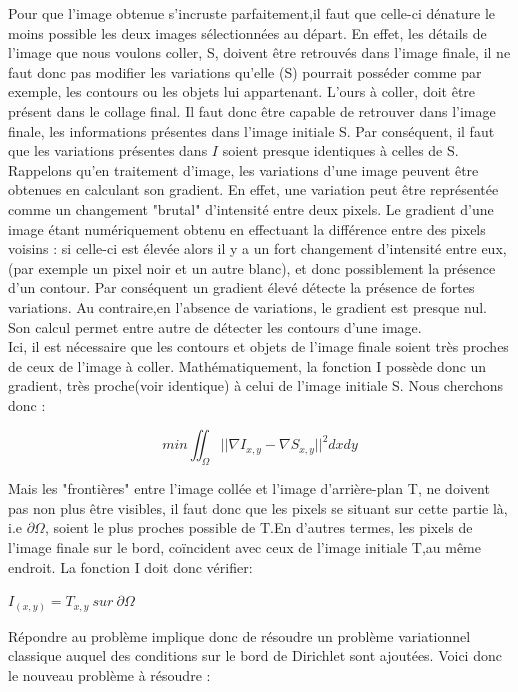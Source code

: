 Pour que l'image obtenue s'incruste parfaitement,il faut que celle-ci dénature le moins possible les deux images sélectionnées au départ. En effet, les détails de l'image que nous voulons coller, S, doivent être retrouvés dans l'image finale, il ne faut donc pas modifier les variations qu'elle (S) pourrait posséder comme par exemple, les contours ou les objets lui appartenant. L'ours  à coller, doit être présent dans le collage final. Il faut donc être capable de retrouver dans l'image finale, les informations présentes dans l'image initiale S. Par conséquent, il faut que les variations présentes dans $I$ soient presque identiques à celles de S.\\
Rappelons qu'en traitement d'image, les variations d'une image peuvent être obtenues en calculant son gradient. En effet, une variation peut être représentée comme un changement "brutal" d'intensité entre deux pixels. Le gradient d'une image étant numériquement obtenu en effectuant la différence entre des pixels voisins : si celle-ci est élevée alors il y a un fort changement d'intensité entre eux, (par exemple un pixel noir et un autre blanc), et donc possiblement la présence d'un contour. Par conséquent un gradient élevé détecte la présence de fortes variations. Au contraire,en l'absence de variations, le gradient est presque nul. Son calcul permet entre autre de détecter les contours d'une image.\\
Ici, il est nécessaire que les contours et objets de l'image finale soient très proches de ceux de l'image à coller. Mathématiquement, la fonction I possède donc un gradient, très proche(voir identique) à celui de l'image initiale S. Nous cherchons donc :
\begin{center}
    $$ min \iint_\Omega || \nabla I_{x,y} - \nabla S_{x,y}||^2 dxdy$$
\end{center} 

Mais les "frontières" entre l'image collée et l'image d'arrière-plan T, ne doivent pas non plus être visibles, il faut donc que les pixels se situant sur cette partie là, i.e $\partial \Omega$, soient le plus proches possible de T.En d'autres termes, les pixels de l'image finale sur le bord, coïncident avec ceux de l'image initiale T,au même endroit. La fonction I doit donc vérifier: 
\begin{center}
    $I_{(x,y)} = T_{x,y} \ sur\ \partial \Omega$
\end{center}

Répondre au problème implique donc de résoudre un problème variationnel classique auquel des conditions sur le bord de Dirichlet sont ajoutées. 
Voici donc le nouveau problème à résoudre :   

